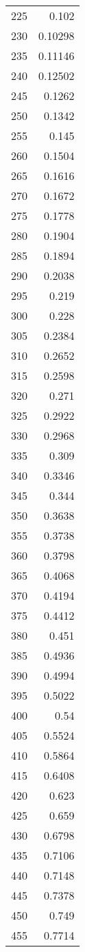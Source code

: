 \begin{supertabular}{ l | *{1}{d{10}}}
225 & 0.102 \\
230 & 0.10298 \\
235 & 0.11146 \\
240 & 0.12502 \\
245 & 0.1262 \\
250 & 0.1342 \\
255 & 0.145 \\
260 & 0.1504 \\
265 & 0.1616 \\
270 & 0.1672 \\
275 & 0.1778 \\
280 & 0.1904 \\
285 & 0.1894 \\
290 & 0.2038 \\
295 & 0.219 \\
300 & 0.228 \\
305 & 0.2384 \\
310 & 0.2652 \\
315 & 0.2598 \\
320 & 0.271 \\
325 & 0.2922 \\
330 & 0.2968 \\
335 & 0.309 \\
340 & 0.3346 \\
345 & 0.344 \\
350 & 0.3638 \\
355 & 0.3738 \\
360 & 0.3798 \\
365 & 0.4068 \\
370 & 0.4194 \\
375 & 0.4412 \\
380 & 0.451 \\
385 & 0.4936 \\
390 & 0.4994 \\
395 & 0.5022 \\
400 & 0.54 \\
405 & 0.5524 \\
410 & 0.5864 \\
415 & 0.6408 \\
420 & 0.623 \\
425 & 0.659 \\
430 & 0.6798 \\
435 & 0.7106 \\
440 & 0.7148 \\
445 & 0.7378 \\
450 & 0.749 \\
455 & 0.7714 \\

\end{supertabular}
